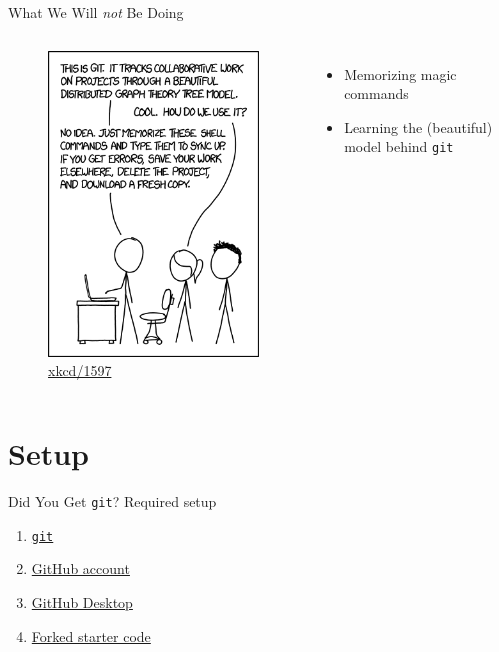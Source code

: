 \documentclass{beamer}
\theoremstyle{example}
\newcommand{\xkcd}[1]{\href{https://xkcd.com/#1}{xkcd/#1}}
\begin{document}
\begin{frame}{What We Will \emph{not} Be Doing}
    \begin{columns}
        \begin{figure}
            \includegraphics[scale=0.4]{img/git}
            \caption{\xkcd{1597}}
        \end{figure}

        \begin{itemize}
            \item Memorizing magic commands
            \item Learning the (beautiful) model behind \texttt{git}
        \end{itemize}
    \end{columns}
\end{frame}


\section{Setup}
\begin{frame}{Did You Get \texttt{git}?}
    Required setup
    \begin{enumerate}[<+->]
        \item
            \href{https://git-scm.com/book/en/v2/Getting-Started-Installing-Git}
            {\texttt{git}}
        \item
            \href{https://github.com}
            {GitHub account}
        \item \href{https://desktop.github.com}
            {GitHub Desktop}
        \item \href{https://github.com/benknoble/git-wizzard-code}
            {Forked starter code}
    \end{enumerate}
\end{frame}
\end{document}
